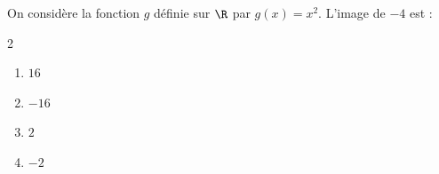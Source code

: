 \begin{exo}{}
	On considère la fonction $g$ définie sur $\R$ par $g(x) = x^2$. L'image de $-4$ est :
	\vspace*{-2mm}\begin{multicols}{2}
	\begin{enumerate}
		\item $16$
		\item $-16$
		\item $2$
		\item $-2$
	\end{enumerate}
	\end{multicols}
\end{exo}

